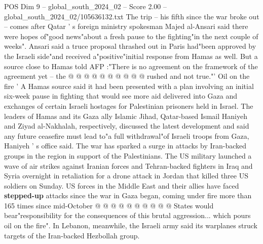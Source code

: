 \begin{textsample}{POS Dim 9 – global\_south\_2024\_02 – Score 2.00 – global\_south\_2024\_02/105636132.txt}
The trip -- his fifth since the war broke out -- comes after Qatar ' s foreign ministry spokesman Majed al-Ansari said there were hopes of"good news"about a fresh pause to the fighting"in the next couple of weeks".
Ansari said a truce proposal thrashed out in Paris had"been approved by the Israeli side"and received a"positive"initial response from Hamas as well.
But a source close to Hamas told AFP :"There is no agreement on the framework of the agreement yet -- the @ @ @ @ @ @ @ @ @ @ rushed and not true."' Oil on the fire ' A Hamas source said it had been presented with a plan involving an initial six-week pause in fighting that would see more aid delivered into Gaza and exchanges of certain Israeli hostages for Palestinian prisoners held in Israel.
The leaders of Hamas and its Gaza ally Islamic Jihad, Qatar-based Ismail Haniyeh and Ziyad al-Nakhalah, respectively, discussed the latest development and said any future ceasefire must lead to"a full withdrawal"of Israeli troops from Gaza, Haniyeh ' s office said.
The war has sparked a surge in attacks by Iran-backed groups in the region in support of the Palestinians.
The US military launched a wave of air strikes against Iranian forces and Tehran-backed fighters in Iraq and Syria overnight in retaliation for a drone attack in Jordan that killed three US soldiers on Sunday.
US forces in the Middle East and their allies have faced \textbf{stepped-up} attacks since the war in Gaza began, coming under fire more than 165 times since mid-October @ @ @ @ @ @ @ @ @ @ States would bear"responsibility for the consequences of this brutal aggression... which pours oil on the fire".
In Lebanon, meanwhile, the Israeli army said its warplanes struck targets of the Iran-backed Hezbollah group.

\end{textsample}
